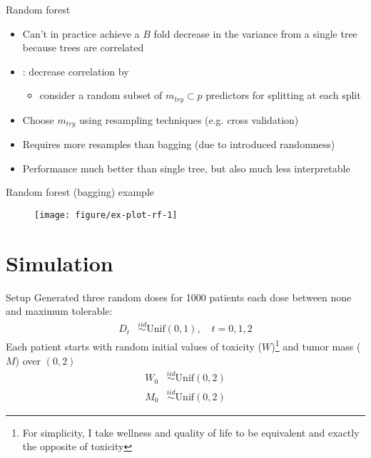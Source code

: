 \documentclass[handout]{beamer}
\begin{document}
\begin{frame}{Random forest}
  
  \begin{itemize}%
    \item Can't in practice achieve a $B$ fold decrease in the variance from a single tree because trees are correlated
    \item \textcite{rf}: decrease correlation by
    \begin{itemize}
      \item consider a random subset of $m_{try} \subset p$ predictors for splitting at each split
    \end{itemize}
    \item Choose $m_{try}$ using resampling techniques (e.g. cross validation)
    \item Requires more resamples than bagging (due to introduced randomness)
    \item Performance much better than single tree, but also much less interpretable 
  \end{itemize}
\end{frame}

\begin{frame}{Random forest (bagging) example}
  
  \begin{figure}[!htb]
  \begin{center}
    \texttt{[image: figure/ex-plot-rf-1]}
  \end{center}
  \end{figure}
  
\end{frame}


\section{Simulation} %
\label{sec:simulation}

\begin{frame}[c]{Setup}
  Generated three random doses for 1000 patients each dose between none and maximum tolerable:
  \begin{align*}
    D_{t} &\overset{iid}{\sim} \text{Unif}(0, 1), \quad t = 0, 1, 2
  \end{align*}
  Each patient starts with random initial values of toxicity ($W$)\footnote{For simplicity, I take wellness and quality of life to be equivalent and exactly the opposite of toxicity} and tumor mass ($M$) over $(0,2)$
  \begin{align*}
    W_{0} &\overset{iid}{\sim} \text{Unif}(0, 2) \\
    M_{0} &\overset{iid}{\sim} \text{Unif}(0, 2)
  \end{align*}
\end{frame}
\end{document}
